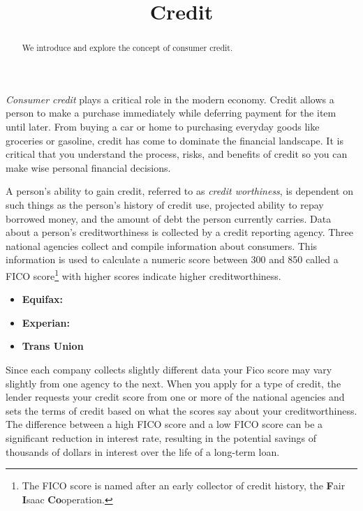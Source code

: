\documentclass{ximera}
\title{Credit}
\begin{document}
\begin{abstract}
We introduce and explore the concept of consumer credit.
\end{abstract}

\maketitle

\emph{Consumer credit} plays a critical role in the modern economy. Credit allows a person to make a purchase immediately while deferring payment for the item until later. From buying a car or home to purchasing everyday goods like groceries or gasoline, credit has come to dominate the financial landscape. It is critical that you understand the process, risks, and benefits of credit so you can make wise personal financial decisions.

A person's ability to gain credit, referred to as \emph{credit worthiness}, is dependent on such things as the person's history of credit use, projected ability to repay borrowed money, and the amount of debt the person currently carries. Data about a person's creditworthiness is collected by a credit reporting agency. Three national agencies collect and compile information about consumers. This information is used to calculate a numeric score between 300 and 850 called a FICO score\footnote{The FICO score is named after an early collector of credit history, the \textbf{F}air \textbf{I}saac \textbf{Co}operation.} with higher scores indicate higher creditworthiness.
\begin{itemize}
\item\textbf{Equifax:} 
\item\textbf{Experian:} 
\item\textbf{Trans Union} 
\end{itemize}

Since each company collects slightly different data your Fico score may vary slightly from one agency to the next.  When you apply for a type of credit, the lender requests your credit score from one or more of the national agencies and sets the terms of credit based on what the scores say about your creditworthiness. The difference between a high FICO score and a low FICO score can be a significant reduction in interest rate, resulting in the potential savings of thousands of dollars in interest over the life of a long-term loan.
\end{document}
